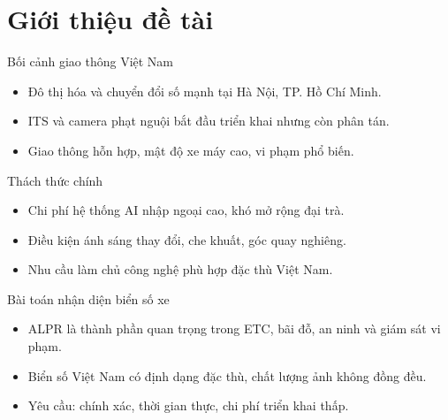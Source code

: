 ﻿%
\section{Giới thiệu đề tài}

\begin{frame}{Bối cảnh giao thông Việt Nam}
    \begin{itemize}
        \item Đô thị hóa và chuyển đổi số mạnh tại Hà Nội, TP. Hồ Chí Minh.
        \item ITS và camera phạt nguội bắt đầu triển khai nhưng còn phân tán.
        \item Giao thông hỗn hợp, mật độ xe máy cao, vi phạm phổ biến.
    \end{itemize}
    \begin{alertblock}{Thách thức chính}
        \begin{itemize}
            \item Chi phí hệ thống AI nhập ngoại cao, khó mở rộng đại trà.
            \item Điều kiện ánh sáng thay đổi, che khuất, góc quay nghiêng.
            \item Nhu cầu làm chủ công nghệ phù hợp đặc thù Việt Nam.
        \end{itemize}
    \end{alertblock}
\end{frame}

\begin{frame}{Bài toán nhận diện biển số xe}
    \begin{itemize}
        \item ALPR là thành phần quan trọng trong ETC, bãi đỗ, an ninh và giám sát vi phạm.
        \item Biển số Việt Nam có định dạng đặc thù, chất lượng ảnh không đồng đều.
        \item Yêu cầu: chính xác, thời gian thực, chi phí triển khai thấp.
    \end{itemize}
\end{frame}

